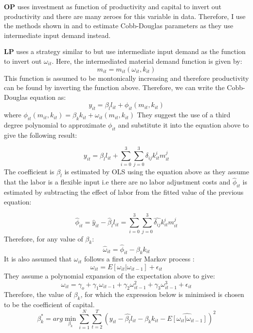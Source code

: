 \documentclass[12pt]{article}
\begin{document}
\textcite{olley1992dynamics} \textbf{OP} uses investment
 as function of productivity and capital to invert out productivity  and there are many zeroes for this variable in
 data. Therefore, I use the  methods shown in \textcite{levinsohn2003estimating} and
\textcite{ackerberg2006structural} to estimate Cobb-Douglas
parameters as they use  intermediate
input demand instead.  


\textcite{levinsohn2003estimating} \textbf{LP} uses a  strategy
similar to \textcite{olley1992dynamics} but use intermediate input demand
as the function to invert out $\omega_{it}$. 
Here, the intermediated material demand function is given by:
$$  m_{it} = m_{it}(\omega_{it}, k_{it})$$
This function is assumed to be montonically increasing and therefore
productivity can be found by inverting the function above. Therefore,
we can write the Cobb-Douglas equation  as: 
$$ y_{it} = \beta_{l}l_{it} + \phi_{it}(m_{it},k_{it})$$
where $\phi_{it}(m_{it},k_{it}) =  \beta_{k}k_{it}+ \omega_{it}(m_{it}, k_{it})$
They suggest the  use of a third degree polynomial to approximate 
$\phi_{it}$ and substitute it into the equation above to give the
following result: 

$$  y_{it} =  \beta_{l}l_{it} + \sum_{i=0}^{3} \sum_{j=0}^{3}
\delta_{ij}k_{it}^{i}m_{it}^{j}$$
The coefficient is $\beta_{l}$ is estimated by OLS using the equation
above as they assume that the labor is a flexible input i.e there are
no labor adjustment costs and $\hat{\phi}_{it}$ is estimated by
subtracting the effect of labor from
the fitted value of the previous equation:


$$ \hat{\phi}_{it} = \hat{y}_{it} - \hat{\beta}_{l}l_{it} =
 \sum_{i=0}^{3} \sum_{j=0}^{3}
\hat{\delta_{ij}}k_{it}^{i}m_{it}^{j}$$
Therefore,  for any value of $\beta_{k}$:
$$\hat{\omega}_{it} = \hat{\phi}_{it} - \beta_{k}k_{it}$$
 It is also assumed that $\omega_{it}$ follows a first order Markov
process : 
$$\omega_{it} = E[\omega_{it}|\omega_{it-1}] + \epsilon_{it}$$
They  assume a polynomial expansion of the expectation above to give:
$$ \omega_{it}=  \gamma_{o}+\gamma_{1}\omega_{it-1} +
\gamma_{2}\omega_{it-1}^2 + \gamma_{3}\omega_{it-1}^3 + \epsilon_{it} $$ 
Therefore, the value of $\beta_{k}$, for which the expression below is
minimised is chosen to be the coefficient of capital.  
\begin{equation}
\beta_{k}^{*} = arg \underset{\beta_{k}}{\min}\sum_{i=1}^{N}\sum_{t=2}^{T} (y_{it} - \hat{\beta_{l}}l_{it} -
\beta_{k}k_{it} - \hat{E[\omega_{it}|\omega_{it-1}]})^2 
\end{equation}
\end{document}
